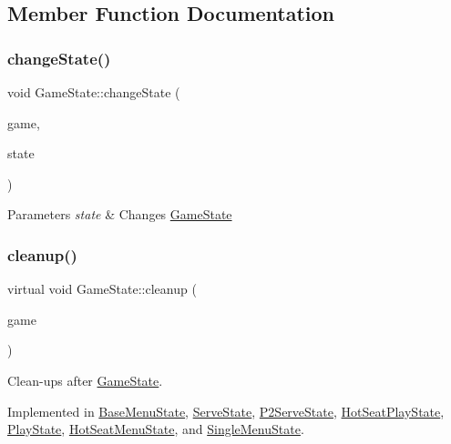\subsection{Member Function Documentation}
\mbox{\label{class_game_state_a5f4ffcaa495af37ba423627e3f961fdb}} 
\subsubsection{\texorpdfstring{changeState()}{changeState()}}
{\footnotesize\ttfamily void Game\+State\+::change\+State (\begin{DoxyParamCaption}\item[{\mbox{\hyperlink{class_game_engine}{Game\+Engine}} $\ast$}]{game,  }\item[{\mbox{\hyperlink{class_game_state}{Game\+State}} $\ast$}]{state }\end{DoxyParamCaption})\hspace{0.3cm}{\ttfamily [inline]}}


\begin{DoxyParams}{Parameters}
{\em state} & Changes \mbox{\hyperlink{class_game_state}{Game\+State}} \\
\hline
\end{DoxyParams}
\mbox{\label{class_game_state_a7df4ea0b4815d2b3b35dbec2a399a0b6}} 
\subsubsection{\texorpdfstring{cleanup()}{cleanup()}}
{\footnotesize\ttfamily virtual void Game\+State\+::cleanup (\begin{DoxyParamCaption}\item[{\mbox{\hyperlink{class_game_engine}{Game\+Engine}} $\ast$}]{game }\end{DoxyParamCaption})\hspace{0.3cm}{\ttfamily [pure virtual]}}



Clean-\/ups after \mbox{\hyperlink{class_game_state}{Game\+State}}. 



Implemented in \mbox{\hyperlink{class_base_menu_state_a6ca2a29b45a0c2d6d2cbbb6ee67d38ac}{Base\+Menu\+State}}, \mbox{\hyperlink{class_serve_state_a3516119feb2bf386b3686867da412328}{Serve\+State}}, \mbox{\hyperlink{class_p2_serve_state_ab5cbfaef01142275fcb6aa2947c9e1b6}{P2\+Serve\+State}}, \mbox{\hyperlink{class_hot_seat_play_state_ae9ca450fc070526a0ee329002e4308f2}{Hot\+Seat\+Play\+State}}, \mbox{\hyperlink{class_play_state_a047657388db62dc5a80b12147b0294b2}{Play\+State}}, \mbox{\hyperlink{class_hot_seat_menu_state_ada87b1a00943777a31b8b24ddf347350}{Hot\+Seat\+Menu\+State}}, and \mbox{\hyperlink{class_single_menu_state_a61fdbb1a47f269d9f99f99ef9312624f}{Single\+Menu\+State}}.

